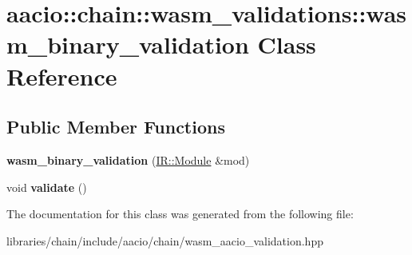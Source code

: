 \hypertarget{classaacio_1_1chain_1_1wasm__validations_1_1wasm__binary__validation}{}\section{aacio\+:\+:chain\+:\+:wasm\+\_\+validations\+:\+:wasm\+\_\+binary\+\_\+validation Class Reference}
\label{classaacio_1_1chain_1_1wasm__validations_1_1wasm__binary__validation}
\subsection*{Public Member Functions}
\begin{DoxyCompactItemize}
\item 
\mbox{\label{classaacio_1_1chain_1_1wasm__validations_1_1wasm__binary__validation_a068124f68e2a2fca35c6de6c4d9ab3b2}} 
{\bfseries wasm\+\_\+binary\+\_\+validation} (\mbox{\hyperlink{struct_i_r_1_1_module}{I\+R\+::\+Module}} \&mod)
\item 
\mbox{\label{classaacio_1_1chain_1_1wasm__validations_1_1wasm__binary__validation_aecb0a420cc9b2df7b5d7be3bbb2ba2dc}} 
void {\bfseries validate} ()
\end{DoxyCompactItemize}


The documentation for this class was generated from the following file\+:\begin{DoxyCompactItemize}
\item 
libraries/chain/include/aacio/chain/wasm\+\_\+aacio\+\_\+validation.\+hpp\end{DoxyCompactItemize}
